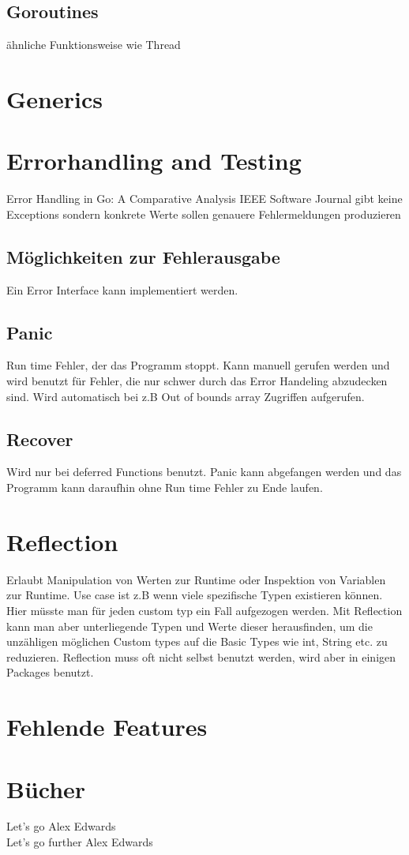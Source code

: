 \subsection{Goroutines}
ähnliche Funktionsweise wie Thread

\section{Generics}

\section{Errorhandling and Testing}
Error Handling in Go: A Comparative Analysis IEEE Software Journal
gibt keine Exceptions sondern konkrete Werte sollen genauere Fehlermeldungen produzieren
\subsection{Möglichkeiten zur Fehlerausgabe}
Ein Error Interface kann implementiert werden.
\subsection{Panic}
Run time Fehler, der das Programm stoppt. Kann manuell gerufen werden und wird benutzt für Fehler, die nur schwer durch das Error Handeling abzudecken sind. Wird automatisch bei z.B Out of bounds array Zugriffen aufgerufen.
\subsection{Recover}
Wird nur bei deferred Functions benutzt. Panic kann abgefangen werden und das Programm kann daraufhin ohne Run time Fehler zu Ende laufen.

\section{Reflection}
Erlaubt Manipulation von Werten zur Runtime oder Inspektion von Variablen zur Runtime. Use case ist z.B wenn viele spezifische Typen existieren können. Hier müsste man für jeden custom typ ein Fall aufgezogen werden. Mit Reflection kann man aber unterliegende Typen und Werte dieser herausfinden, um die unzähligen möglichen Custom types auf die Basic Types wie int, String etc. zu reduzieren.
Reflection muss oft nicht selbst benutzt werden, wird aber in einigen Packages benutzt.

\section{Fehlende Features}

\section{Bücher}
Let's go Alex Edwards\\ 
Let's go further Alex Edwards\\

